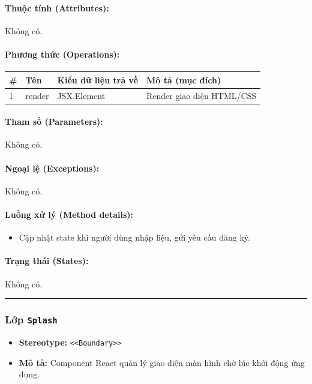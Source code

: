 \documentclass[12pt,a4paper]{article}
\begin{document}
\paragraph{Thuộc tính (Attributes):}
Không có.

\paragraph{Phương thức (Operations):}
\begin{longtable}{|p{0.6cm}|p{3.8cm}|p{2.6cm}|p{6.5cm}|}
\hline
\textbf{\#} & \textbf{Tên} & \textbf{Kiểu dữ liệu trả về} & \textbf{Mô tả (mục đích)} \\ \hline
\endhead
1 & render & JSX.Element & Render giao diện HTML/CSS \\ \hline
\end{longtable}

\paragraph{Tham số (Parameters):}
Không có.

\paragraph{Ngoại lệ (Exceptions):}
Không có.

\paragraph{Luồng xử lý (Method details):}
\begin{itemize}[leftmargin=*]
    \item Cập nhật state khi người dùng nhập liệu, gửi yêu cầu đăng ký.
\end{itemize}


\paragraph{Trạng thái (States):}
Không có.

\vskip 0.5cm
\noindent\rule{\textwidth}{0.5pt}
\vskip 0.5cm

\subsubsection{Lớp \texttt{Splash}}
\begin{itemize}[leftmargin=*]
    \item \textbf{Stereotype:} \texttt{\textless{}\textless{}Boundary\textgreater{}\textgreater{}}
    \item \textbf{Mô tả:} Component React quản lý giao diện màn hình chờ lúc khởi động ứng dụng.
\end{itemize}
\end{document}
